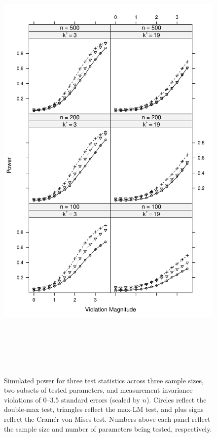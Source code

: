 \documentclass[man]{apa}
\begin{document}
\begin{figure}
\caption{Simulated power for three test statistics across three sample
  sizes, two subsets of tested parameters, and measurement invariance
  violations of 0--3.5 standard 
  errors (scaled by $n$).  Circles reflect the double-max test,
  triangles reflect the 
  max-LM test, and plus signs reflect the Cram\'{e}r-von Mises test.
  Numbers above each panel reflect the sample size and number of
  parameters being tested, respectively.}
\label{fig:simres}
\includegraphics[height=9in]{simres.pdf}
\end{figure}
\end{document}
